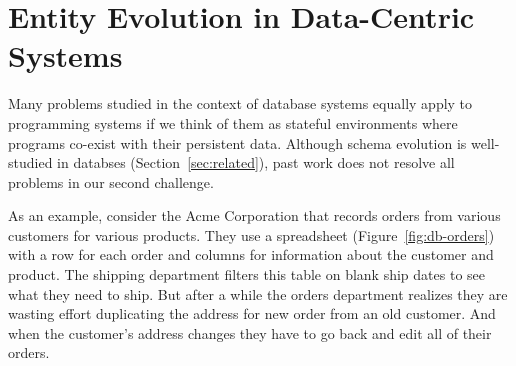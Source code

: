 \documentclass[english,submission]{programming}
\begin{document}

\section{Entity Evolution in Data-Centric Systems}
Many problems studied in the context of database systems equally apply to programming systems
if we think of them as stateful environments where programs co-exist with their persistent data.
Although schema evolution is well-studied in databses (Section~\ref{sec:related}), past work
does not resolve all problems in our second challenge.

As an example, consider the Acme Corporation that records orders from various customers for
various products. They use a spreadsheet (Figure~\ref{fig:db-orders}) with a row for each order
and columns for information about the customer and product. The shipping department filters this
table on blank ship dates to see what they need to ship. But after a while the orders department
realizes they are wasting effort duplicating the address for new order from an old customer. And
when the customer's address changes they have to go back and edit all of their orders.
\end{document}
